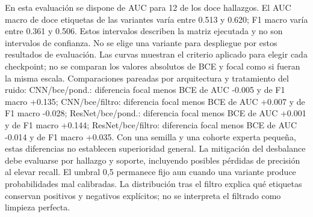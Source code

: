 En esta evaluación se dispone de AUC para 12 de los doce hallazgos. El AUC macro de doce etiquetas de las variantes varía entre 0.513 y 0.620; F1 macro varía entre 0.361 y 0.506. Estos intervalos describen la matriz ejecutada y no son intervalos de confianza. No se elige una variante para despliegue por estos resultados de evaluación. Las curvas muestran el criterio aplicado para elegir cada checkpoint; no se comparan los valores absolutos de BCE y focal como si fueran la misma escala.  Comparaciones pareadas por arquitectura y tratamiento del ruido: CNN/bce/pond.: diferencia focal menos BCE de AUC -0.005 y de F1 macro +0.135; CNN/bce/filtro: diferencia focal menos BCE de AUC +0.007 y de F1 macro -0.028; ResNet/bce/pond.: diferencia focal menos BCE de AUC +0.001 y de F1 macro +0.144; ResNet/bce/filtro: diferencia focal menos BCE de AUC -0.014 y de F1 macro +0.035. Con una semilla y una cohorte experta pequeña, estas diferencias no establecen superioridad general. La mitigación del desbalance debe evaluarse por hallazgo y soporte, incluyendo posibles pérdidas de precisión al elevar recall. El umbral 0,5 permanece fijo aun cuando una variante produce probabilidades mal calibradas. La distribución tras el filtro explica qué etiquetas conservan positivos y negativos explícitos; no se interpreta el filtrado como limpieza perfecta.